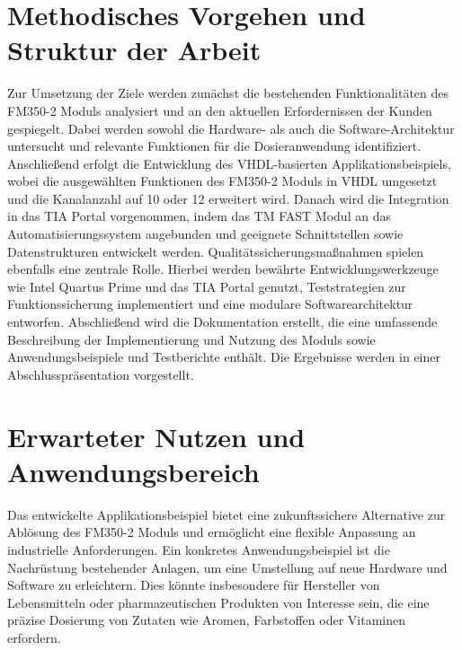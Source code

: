 \section{Methodisches Vorgehen und Struktur der Arbeit} 
Zur Umsetzung der Ziele werden zunächst die bestehenden Funktionalitäten des FM350-2 Moduls analysiert und an den aktuellen Erfordernissen der Kunden gespiegelt. Dabei werden sowohl 
die Hardware- als auch die Software-Architektur untersucht und relevante Funktionen für die Dosieranwendung identifiziert. Anschließend erfolgt die Entwicklung des VHDL-basierten 
Applikationsbeispiels, wobei die ausgewählten Funktionen des FM350-2 Moduls in VHDL umgesetzt und die Kanalanzahl auf 10 oder 12 erweitert wird. Danach wird die Integration in das 
TIA Portal vorgenommen, indem das TM FAST Modul an das Automatisierungssystem angebunden und geeignete Schnittstellen sowie Datenstrukturen entwickelt werden. 
Qualitätssicherungsmaßnahmen spielen ebenfalls eine zentrale Rolle. Hierbei werden bewährte Entwicklungswerkzeuge wie Intel Quartus Prime und das TIA Portal genutzt, 
Teststrategien zur Funktionssicherung implementiert und eine modulare Softwarearchitektur entworfen. Abschließend wird die Dokumentation erstellt, die eine umfassende 
Beschreibung der Implementierung und Nutzung des Moduls sowie Anwendungsbeispiele und Testberichte enthält. Die Ergebnisse werden in einer Abschlusspräsentation vorgestellt. 
\section{Erwarteter Nutzen und Anwendungsbereich}
Das entwickelte Applikationsbeispiel bietet eine zukunftssichere Alternative zur Ablösung des FM350-2 Moduls und ermöglicht eine flexible Anpassung an industrielle Anforderungen. 
Ein konkretes Anwendungsbeispiel ist die Nachrüstung bestehender Anlagen, um eine Umstellung auf neue Hardware und Software zu erleichtern. Dies könnte insbesondere für Hersteller 
von Lebensmitteln oder pharmazeutischen Produkten von Interesse sein, die eine präzise Dosierung von Zutaten wie Aromen, Farbstoffen oder Vitaminen erfordern. 